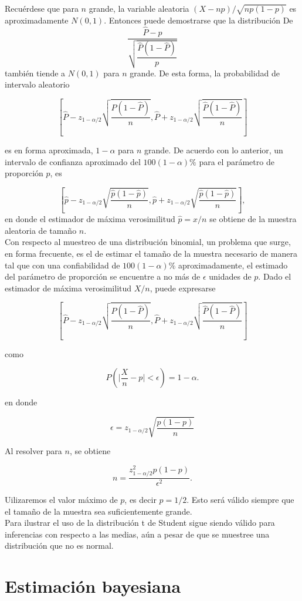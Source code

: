 Recuérdese que para $n$ grande, la variable aleatoria $(X-np)/\sqrt{np(1-p)}$ es aproximadamente $N(0,1)$. Entonces puede demostrarse que la distribución De
$$\dfrac{\hat{P}-p}{\sqrt{\dfrac{\hat{P}\left(1-\hat{P}\right)}{p}}}$$
también tiende a $N(0,1)$ para $n$ grande. De esta forma, la probabilidad de intervalo aleatorio

$$\left[\hat{P}-z_{1-\alpha/2}\sqrt{\dfrac{\hat{P}\left(1-\hat{P}\right)}{n}},\hat{P}+z_{1-\alpha/2}\sqrt{\dfrac{\hat{P}\left(1-\hat{P}\right)}{n}}\right]$$

es en forma aproximada, $1-\alpha$ para $n$ grande. De acuerdo con lo anterior, un intervalo de confianza aproximado del $100(1-\alpha)\%$ para el parámetro de proporción $p$, es

$$\left[\hat{p}-z_{1-\alpha/2}\sqrt{\dfrac{\hat{p}\left(1-\hat{p}\right)}{n}},\hat{p}+z_{1-\alpha/2}\sqrt{\dfrac{\hat{p}\left(1-\hat{p}\right)}{n}}\right],$$
en donde el estimador de máxima verosimilitud $\hat{p}=x/n$ se obtiene de la muestra aleatoria de tamaño $n$.\\

Con respecto al muestreo de una distribución binomial, un problema que surge, en forma frecuente, es el de estimar el tamaño de la muestra necesario de manera tal que con una confiabilidad de $100(1-\alpha)\%$ aproximadamente, el estimado del parámetro de proporción se encuentre a no más de $\epsilon$ unidades de $p$. Dado el estimador de máxima verosimilitud $X/n$, puede expresarse 

$$\left[\hat{P}-z_{1-\alpha/2}\sqrt{\dfrac{\hat{P}\left(1-\hat{P}\right)}{n}},\hat{P}+z_{1-\alpha/2}\sqrt{\dfrac{\hat{P}\left(1-\hat{P}\right)}{n}}\right]$$

como

$$P\left(\Bigg|\dfrac{X}{n}-p\Bigg|<\epsilon\right) = 1-\alpha.$$

en donde

$$\epsilon = z_{1-\alpha/2}\sqrt{\dfrac{p(1-p)}{n}}$$

Al resolver para $n$, se obtiene

$$n=\dfrac{z_{1-\alpha/2}^2p(1-p)}{\epsilon^2}.$$

Uilizaremos el valor máximo de $p$, es decir $p=1/2$.  Esto será válido siempre que el tamaño de la muestra sea suficientemente grande.\\

Para ilustrar el uso de la distribución t de Student sigue siendo válido para inferencias con respecto a las medias, aún a pesar de que se muestree una distribución que no es normal.


\section{Estimación bayesiana}


